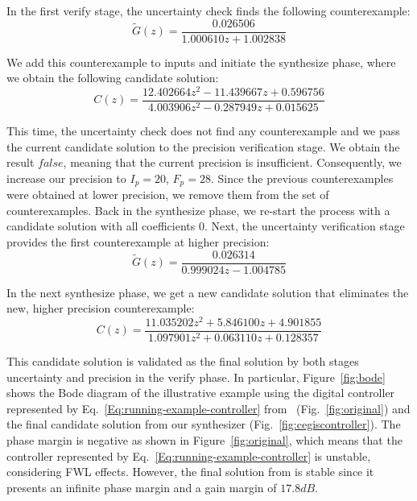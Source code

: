 \documentclass{sig-alternate-05-2015}
\newcommand{\red}[1]{{\color{red}#1}}
\begin{document}
In the first {\sc verify} stage, the {\sc uncertainty} 
check finds the following counterexample:
%
$$ \tilde G(z) = \frac{0.026506}{1.000610z+1.002838} $$


We add this counterexample to {\sc inputs} and initiate the {\sc synthesize}
phase, where we obtain the following candidate solution:
%
$$
C(z)=\frac{12.402664z^2{-}11.439667z{+}0.596756}{4.003906z^2{-}0.287949z{+}0.015625}
$$

This time, the {\sc uncertainty} check does not find any
counterexample and we pass the current candidate solution to the {\sc
precision} verification stage.
%
%
We obtain the result $\mathit{false}$, meaning that the current precision is
insufficient.  Consequently, we increase our precision to $I_p=20$, $F_p=28$.
%
Since the previous counterexamples were obtained at lower precision, we
remove them from the set of counterexamples.  Back in the {\sc synthesize}
phase, we re-start the process with a candidate solution with all
coefficients $0$.  Next, the {\sc uncertainty} verification stage provides
the first counterexample at higher precision:
%
$$ \tilde G(z) = \frac{0.026314}{0.999024z{-}1.004785} $$

In the next {\sc synthesize} phase, we get a new candidate solution that
eliminates the new, higher precision counterexample:
%
$$ C(z)=\frac{11.035202z^2{+}5.846100z{+}4.901855}{1.097901z^2{+}0.063110z{+}0.128357} $$
%

This candidate solution is validated as the final solution by both stages
{\sc uncertainty} and {\sc precision} in the {\sc verify} phase.
In particular, Figure~\ref{fig:bode} shows the Bode diagram of the illustrative example 
using the digital controller represented by Eq.~\eqref{Eq:running-example-controller} from~\cite{DBLP:conf/hybrid/WangGRJF16} 
(Fig.~\ref{fig:original}) and the final candidate solution from our synthesizer (Fig.~\ref{fig:cegiscontroller}). 
The phase margin is negative as shown in Figure~\ref{fig:original}, which means that the controller 
represented by Eq.~\eqref{Eq:running-example-controller} is unstable, considering FWL effects. 
However, the final solution from \tool is stable since it presents an infinite phase margin 
and a gain margin of $17.8 dB$.
\end{document}
